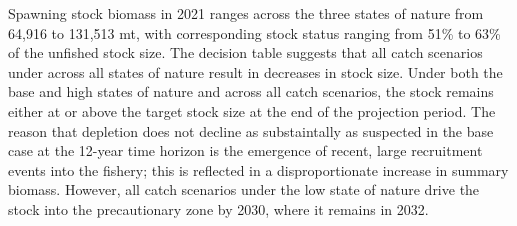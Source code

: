 \documentclass[11pt,
  english,
  a4paper,
]{article}
\begin{document}
Spawning stock biomass in 2021 ranges across the three states of nature from 64,916 to 131,513 mt, with corresponding stock status ranging from 51\% to 63\% of the unfished stock size. The decision table suggests that all catch scenarios under across all states of nature result in decreases in stock size. Under both the base and high states of nature and across all catch scenarios, the stock remains either at or above the target stock size at the end of the projection period. The reason that depletion does not decline as substaintally as suspected in the base case at the 12-year time horizon is the emergence of recent, large recruitment events into the fishery; this is reflected in a disproportionate increase in summary biomass. However, all catch scenarios under the low state of nature drive the stock into the precautionary zone by 2030, where it remains in 2032.

\leavevmode\tagmcend\tagstructend\par

\clearpage
\end{document}
